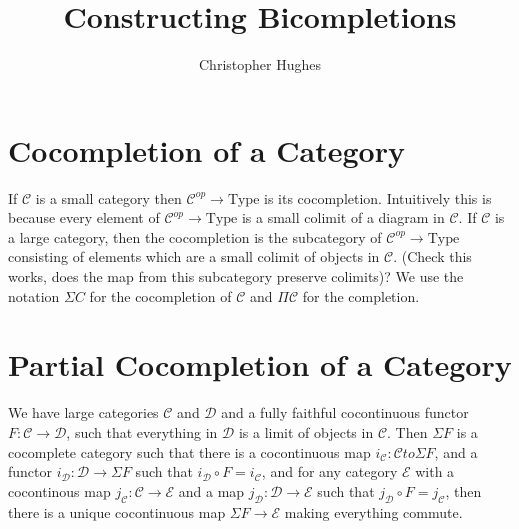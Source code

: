 \documentclass[12pt]{article} %
\title{Constructing Bicompletions}
\author{Christopher Hughes}
\theoremstyle{definition}
\theoremstyle{definition}
\theoremstyle{definition}
\theoremstyle{definition}
\begin{document}
\section{Cocompletion of a Category}
If $\mathcal{C}$ is a small category then $\mathcal{C}^{op} \rightarrow \text{Type}$ is its cocompletion.
Intuitively this is because every element of $\mathcal{C}^{op} \rightarrow \text{Type}$ is a small colimit of 
a diagram in $\mathcal{C}$. If $\mathcal{C}$ is a large category, then the cocompletion is the subcategory 
of $\mathcal{C}^{op} \rightarrow \text{Type}$ consisting of elements which are a small colimit of objects in $\mathcal{C}$.
(Check this works, does the map from this subcategory preserve colimits)? We use the notation $\Sigma {C}$ for the cocompletion
of $\mathcal{C}$ and $\Pi \mathcal{C}$ for the completion.

\section{Partial Cocompletion of a Category}

We have large categories $\mathcal{C}$ and $\mathcal{D}$ and a fully faithful cocontinuous functor $F : \mathcal{C} \to \mathcal{D}$,
such that everything in $\mathcal{D}$ is a limit of objects in $\mathcal{C}$. Then $\Sigma F$ is a cocomplete category such that
there is a cocontinuous map $i_\mathcal{C} : \mathcal{C} to \Sigma F$, and a functor 
$i_\mathcal{D} : \mathcal{D} \to \Sigma F$ such that $i_\mathcal{D} \circ F = i_\mathcal{C}$, and for any category $\mathcal{E}$
with a cocontinous map $j_\mathcal{C} : \mathcal{C} \to \mathcal{E}$ and a map $j_\mathcal{D} : \mathcal{D} \to \mathcal{E}$
such that $j_\mathcal{D} \circ F = j_\mathcal{C}$, then there is a unique cocontinuous map $\Sigma F \to \mathcal{E}$ making everything
commute.

\end{document}
